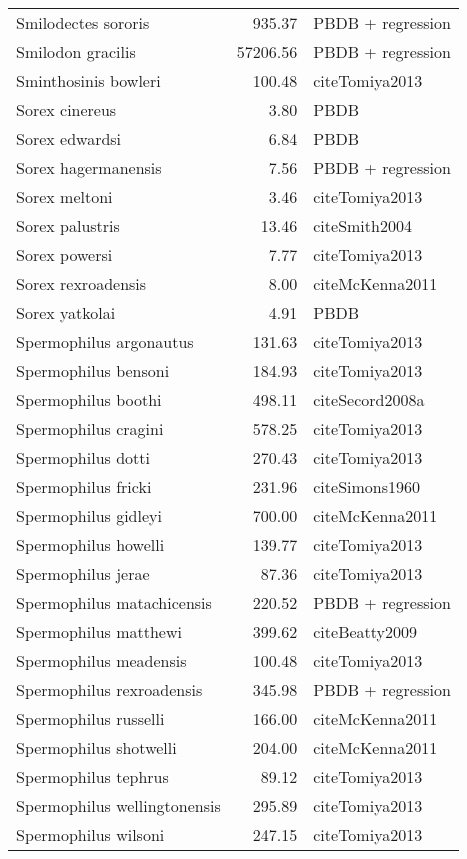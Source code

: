 \begin{table}[ht]
\begin{tabular}{lrl}
  Smilodectes sororis & 935.37 & PBDB + regression \\ 
  Smilodon gracilis & 57206.56 & PBDB + regression \\ 
  Sminthosinis bowleri & 100.48 & cite{Tomiya2013} \\ 
  Sorex cinereus & 3.80 & PBDB \\ 
  Sorex edwardsi & 6.84 & PBDB \\ 
  Sorex hagermanensis & 7.56 & PBDB + regression \\ 
  Sorex meltoni & 3.46 & cite{Tomiya2013} \\ 
  Sorex palustris & 13.46 & cite{Smith2004} \\ 
  Sorex powersi & 7.77 & cite{Tomiya2013} \\ 
  Sorex rexroadensis & 8.00 & cite{McKenna2011} \\ 
  Sorex yatkolai & 4.91 & PBDB \\ 
  Spermophilus argonautus & 131.63 & cite{Tomiya2013} \\ 
  Spermophilus bensoni & 184.93 & cite{Tomiya2013} \\ 
  Spermophilus boothi & 498.11 & cite{Secord2008a} \\ 
  Spermophilus cragini & 578.25 & cite{Tomiya2013} \\ 
  Spermophilus dotti & 270.43 & cite{Tomiya2013} \\ 
  Spermophilus fricki & 231.96 & cite{Simons1960} \\ 
  Spermophilus gidleyi & 700.00 & cite{McKenna2011} \\ 
  Spermophilus howelli & 139.77 & cite{Tomiya2013} \\ 
  Spermophilus jerae & 87.36 & cite{Tomiya2013} \\ 
  Spermophilus matachicensis & 220.52 & PBDB + regression \\ 
  Spermophilus matthewi & 399.62 & cite{Beatty2009} \\ 
  Spermophilus meadensis & 100.48 & cite{Tomiya2013} \\ 
  Spermophilus rexroadensis & 345.98 & PBDB + regression \\ 
  Spermophilus russelli & 166.00 & cite{McKenna2011} \\ 
  Spermophilus shotwelli & 204.00 & cite{McKenna2011} \\ 
  Spermophilus tephrus & 89.12 & cite{Tomiya2013} \\ 
  Spermophilus wellingtonensis & 295.89 & cite{Tomiya2013} \\ 
  Spermophilus wilsoni & 247.15 & cite{Tomiya2013} \\ 

\end{tabular}
\end{table}
